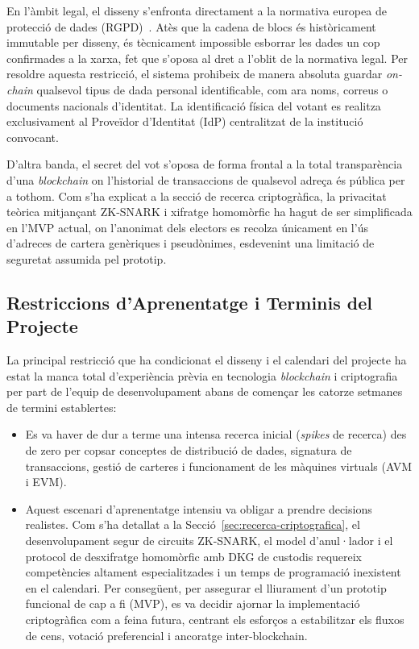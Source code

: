 En l'àmbit legal, el disseny s'enfronta directament a la normativa europea de protecció de dades (RGPD)~\cite{eu2016gdpr}.
Atès que la cadena de blocs és històricament immutable per disseny, és tècnicament impossible esborrar les dades un cop
confirmades a la xarxa, fet que s'oposa al dret a l'oblit de la normativa legal.
Per resoldre aquesta restricció, el sistema prohibeix de manera absoluta guardar \textit{on-chain} qualsevol tipus de
dada personal identificable, com ara noms, correus o documents nacionals d'identitat.
La identificació física del votant es realitza exclusivament al Proveïdor d'Identitat (\ac{IdP}) centralitzat de la
institució convocant.

D'altra banda, el secret del vot s'oposa de forma frontal a la total transparència d'una \textit{blockchain} on
l'historial de transaccions de qualsevol adreça és pública per a tothom.
Com s'ha explicat a la secció de recerca criptogràfica, la privacitat teòrica mitjançant \ac{ZK-SNARK} i xifratge
homomòrfic ha hagut de ser simplificada en l'\ac{MVP} actual, on l'anonimat dels electors es recolza únicament en l'ús
d'adreces de cartera genèriques i pseudònimes, esdevenint una limitació de seguretat assumida pel prototip.

\subsection{Restriccions d'Aprenentatge i Terminis del Projecte}
\label{subsec:restriccions-aprenentatge}

La principal restricció que ha condicionat el disseny i el calendari del projecte ha estat la manca total d'experiència
prèvia en tecnologia \textit{blockchain} i criptografia per part de l'equip de desenvolupament abans de començar les
catorze setmanes de termini establertes:

\begin{itemize}
    \item Es va haver de dur a terme una intensa recerca inicial (\textit{spikes} de recerca) des de zero per copsar
    conceptes de distribució de dades, signatura de transaccions, gestió de carteres i funcionament de les màquines
    virtuals (\ac{AVM} i \ac{EVM}).

    \item Aquest escenari d'aprenentatge intensiu va obligar a prendre decisions realistes.
    Com s'ha detallat a la Secció~\ref{sec:recerca-criptografica}, el desenvolupament segur de circuits \ac{ZK-SNARK},
    el model d'anul·lador i el protocol de desxifratge homomòrfic amb DKG de custodis requereix competències altament
    especialitzades i un temps de programació inexistent en el calendari.
    Per consegüent, per assegurar el lliurament d'un prototip funcional de cap a fi (\ac{MVP}), es va decidir ajornar la
    implementació criptogràfica com a feina futura, centrant els esforços a estabilitzar els fluxos de cens, votació
    preferencial i ancoratge inter-blockchain.
\end{itemize}


